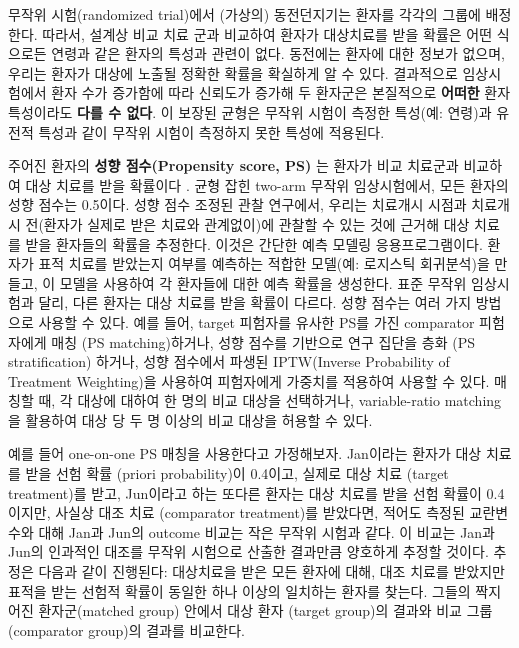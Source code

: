 \documentclass[11pt]{book}
\theoremstyle{definition}
\theoremstyle{definition}
\theoremstyle{definition}
\theoremstyle{remark}
\begin{document}
무작위 시험(randomized trial)에서 (가상의) 동전던지기는 환자를 각각의
그룹에 배정한다. 따라서, 설계상 비교 치료 군과 비교하여 환자가
대상치료를 받을 확률은 어떤 식으로든 연령과 같은 환자의 특성과 관련이
없다. 동전에는 환자에 대한 정보가 없으며, 우리는 환자가 대상에 노출될
정확한 확률을 확실하게 알 수 있다. 결과적으로 임상시험에서 환자 수가
증가함에 따라 신뢰도가 증가해 두 환자군은 본질적으로 \textbf{어떠한}
환자 특성이라도 \textbf{다를 수 없다}. 이 보장된 균형은 무작위 시험이
측정한 특성(예: 연령)과 유전적 특성과 같이 무작위 시험이 측정하지 못한
특성에 적용된다. 

주어진 환자의 \textbf{성향 점수(Propensity score, PS)} 는 환자가 비교
치료군과 비교하여 대상 치료를 받을 확률이다 \citep{rosenbaum_1983}. 균형
잡힌 two-arm 무작위 임상시험에서, 모든 환자의 성향 점수는 0.5이다. 성향
점수 조정된 관찰 연구에서, 우리는 치료개시 시점과 치료개시 전(환자가
실제로 받은 치료와 관계없이)에 관찰할 수 있는 것에 근거해 대상 치료를
받을 환자들의 확률을 추정한다. 이것은 간단한 예측 모델링
응용프로그램이다. 환자가 표적 치료를 받았는지 여부를 예측하는 적합한
모델(예: 로지스틱 회귀분석)을 만들고, 이 모델을 사용하여 각 환자들에
대한 예측 확률을 생성한다. 표준 무작위 임상시험과 달리, 다른 환자는 대상
치료를 받을 확률이 다르다. 성향 점수는 여러 가지 방법으로 사용할 수
있다. 예를 들어, target 피험자를 유사한 PS를 가진 comparator 피험자에게
매칭 (PS matching)하거나, 성향 점수를 기반으로 연구 집단을 층화 (PS
stratification) 하거나, 성향 점수에서 파생된 IPTW(Inverse Probability of
Treatment Weighting)을 사용하여 피험자에게 가중치를 적용하여 사용할 수
있다. 매칭할 때, 각 대상에 대하여 한 명의 비교 대상을 선택하거나,
variable-ratio matching을 활용하여 대상 당 두 명 이상의 비교 대상을
허용할 수 있다. \citep{rassen_2012} 

예를 들어 one-on-one PS 매칭을 사용한다고 가정해보자. Jan이라는 환자가
대상 치료를 받을 선험 확률 (priori probability)이 0.4이고, 실제로 대상
치료 (target treatment)를 받고, Jun이라고 하는 또다른 환자는 대상 치료를
받을 선험 확률이 0.4이지만, 사실상 대조 치료 (comparator treatment)를
받았다면, 적어도 측정된 교란변수와 대해 Jan과 Jun의 outcome 비교는 작은
무작위 시험과 같다. 이 비교는 Jan과 Jun의 인과적인 대조를 무작위
시험으로 산출한 결과만큼 양호하게 추정할 것이다. 추정은 다음과 같이
진행된다: 대상치료을 받은 모든 환자에 대해, 대조 치료를 받았지만 표적을
받는 선험적 확률이 동일한 하나 이상의 일치하는 환자를 찾는다. 그들의
짝지어진 환자군(matched group) 안에서 대상 환자 (target group)의 결과와
비교 그룹 (comparator group)의 결과를 비교한다.
\end{document}
